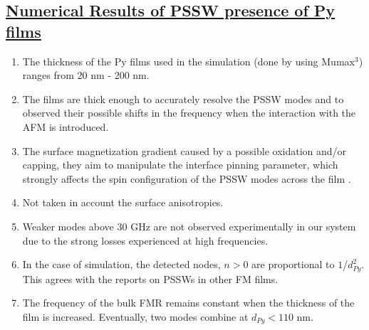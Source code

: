 \subsection*{\underline{Numerical Results of PSSW presence of Py films}}
\begin{enumerate}[1.]
        \item The thickness of the Py films used in the simulation (done by using Mumax$^3$) ranges from 20 nm - 200 nm.
        \item The films are thick enough to accurately resolve the PSSW modes and to observed their possible shifts in the frequency when the interaction with the AFM is introduced.
        \item The surface magnetization gradient caused by a possible oxidation and/or capping, they aim to manipulate the interface pinning parameter, which strongly affects the spin configuration of the PSSW modes across the film \cite{waring2023exchange}.
        \item Not taken in account the surface anisotropies.
        \item Weaker modes above 30 GHz are not observed experimentally in our system due to the strong losses experienced at high frequencies.
        \item In the case of simulation, the detected nodes, $n>0$ are proportional to $1$/$d^2_{Py}$. This agrees with the reports on PSSWs in other FM films.
        \item The frequency of the bulk FMR remains constant when the thickness of the film is increased. Eventually, two modes combine at $d_{Py}< 110$ nm.
\end{enumerate}
